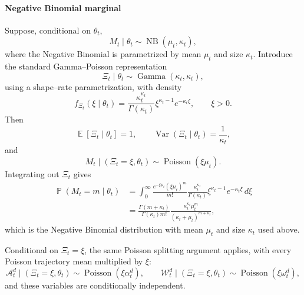 \documentclass{article}
\theoremstyle{definition}
\theoremstyle{remark}
\newcommand{\Pois}{\operatorname{Poisson}}
\newcommand{\NB}{\operatorname{NB}}
\newcommand{\E}{\operatorname{\mathbb{E}}}
\newcommand{\Var}{\operatorname{Var}}
\newcommand{\Prb}{\operatorname{\mathbb{P}}}
\begin{document}
\paragraph{Negative Binomial marginal}
Suppose, conditional on $\theta_t$,
\begin{equation}
    M_t\mid\theta_t\sim\NB(\mu_t,\kappa_t),
\end{equation}
where the Negative Binomial is parametrized by mean $\mu_t$ and size $\kappa_t$. Introduce the standard Gamma--Poisson representation
\begin{equation}\label{xidef}
    \Xi_t\mid\theta_t\sim\operatorname{Gamma}(\kappa_t,\kappa_t),
\end{equation}
using a shape--rate parametrization, with density
\begin{equation}\label{xidensity}
    f_{\Xi_t}(\xi\mid\theta_t)
    =
    \frac{\kappa_t^{\kappa_t}}{\Gamma(\kappa_t)}
    \xi^{\kappa_t-1}e^{-\kappa_t\xi},
    \qquad \xi>0.
\end{equation}
Then
\begin{equation}
    \E[\Xi_t\mid\theta_t]=1,
    \qquad
    \Var(\Xi_t\mid\theta_t)=\frac{1}{\kappa_t},
\end{equation}
and
\begin{equation}\label{nbmixture}
    M_t\mid(\Xi_t=\xi,\theta_t)
    \sim
    \Pois(\xi\mu_t).
\end{equation}
Integrating out $\Xi_t$ gives
\begin{equation}\label{nbmixturecheck}
\begin{split}
\Prb(M_t=m\mid\theta_t)
&=
\int_0^\infty
\frac{e^{-\xi\mu_t}(\xi\mu_t)^m}{m!}
\frac{\kappa_t^{\kappa_t}}{\Gamma(\kappa_t)}
\xi^{\kappa_t-1}e^{-\kappa_t\xi}\,d\xi\\
&=
\frac{\Gamma(m+\kappa_t)}{\Gamma(\kappa_t)m!}
\frac{\kappa_t^{\kappa_t}\mu_t^m}
{(\kappa_t+\mu_t)^{m+\kappa_t}},
\end{split}
\end{equation}
which is the Negative Binomial distribution with mean $\mu_t$ and size $\kappa_t$ used above.

Conditional on $\Xi_t=\xi$, the same Poisson splitting argument applies, with every Poisson trajectory mean multiplied by $\xi$:
\begin{equation}
    \mathcal A_t^d\mid(\Xi_t=\xi,\theta_t)
    \sim
    \Pois(\xi\alpha_t^d),
    \qquad
    \mathcal W_t^d\mid(\Xi_t=\xi,\theta_t)
    \sim
    \Pois(\xi\omega_t^d),
\end{equation}
and these variables are conditionally independent.
\end{document}
